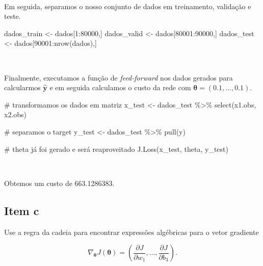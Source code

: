 \documentclass[
  a4paperpaper,
]{article}
\newenvironment{Shaded}{\begin{snugshade}}{\end{snugshade}}
\newcommand{\CommentTok}[1]{\textcolor[rgb]{0.37,0.37,0.37}{#1}}
\newcommand{\DecValTok}[1]{\textcolor[rgb]{0.68,0.00,0.00}{#1}}
\newcommand{\FunctionTok}[1]{\textcolor[rgb]{0.28,0.35,0.67}{#1}}
\newcommand{\NormalTok}[1]{\textcolor[rgb]{0.00,0.23,0.31}{#1}}
\newcommand{\OtherTok}[1]{\textcolor[rgb]{0.00,0.23,0.31}{#1}}
\newcommand{\SpecialCharTok}[1]{\textcolor[rgb]{0.37,0.37,0.37}{#1}}
\begin{document}
~

Em seguida, separamos o nosso conjunto de dados em treinamento,
validação e teste.

\begin{Shaded}
\begin{Highlighting}[]
\NormalTok{dados\_train }\OtherTok{\textless{}{-}}\NormalTok{ dados[}\DecValTok{1}\SpecialCharTok{:}\DecValTok{80000}\NormalTok{,]}
\NormalTok{dados\_valid }\OtherTok{\textless{}{-}}\NormalTok{ dados[}\DecValTok{80001}\SpecialCharTok{:}\DecValTok{90000}\NormalTok{,]}
\NormalTok{dados\_test }\OtherTok{\textless{}{-}}\NormalTok{ dados[}\DecValTok{90001}\SpecialCharTok{:}\FunctionTok{nrow}\NormalTok{(dados),]}
\end{Highlighting}
\end{Shaded}

~

Finalmente, executamos a função de \emph{feed-forward} nos dados gerados
para calcularmos \(\boldsymbol{\hat{y}}\) e em seguida calculamos o
custo da rede com \(\boldsymbol{\theta} = (0.1, \dots, 0.1)\).

\begin{Shaded}
\begin{Highlighting}[]
\CommentTok{\# transformamos os dados em matriz}
\NormalTok{x\_test }\OtherTok{\textless{}{-}}\NormalTok{ dados\_test }\SpecialCharTok{\%\textgreater{}\%} 
  \FunctionTok{select}\NormalTok{(x1.obs, x2.obs)}

\CommentTok{\# separamos o target}
\NormalTok{y\_test }\OtherTok{\textless{}{-}}\NormalTok{ dados\_test }\SpecialCharTok{\%\textgreater{}\%}
  \FunctionTok{pull}\NormalTok{(y)}

\CommentTok{\# theta já foi gerado e será reaproveitado}
\FunctionTok{J.Loss}\NormalTok{(x\_test, theta, y\_test)}
\end{Highlighting}
\end{Shaded}

~

Obtemos um custo de 663.1286383.

\subsection{Item c}\label{item-c}

Use a regra da cadeia para encontrar expressões algébricas para o vetor
gradiente

\[
\nabla_{\boldsymbol{\theta}}J(\boldsymbol{\theta}) = \left( \frac{\partial J}{\partial w_1}, \dots, \frac{\partial J}{\partial b_3} \right).
\]
\end{document}
